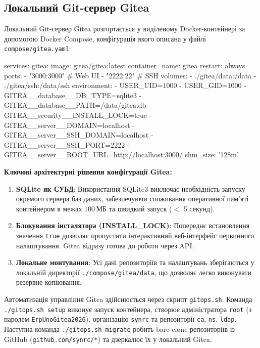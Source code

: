 \documentclass[12pt,a4paper]{article}
\let\originalfootnotesize\footnotesize
\let\oldverbatim\verbatim
\let\oldendverbatim\endverbatim
\renewenvironment{verbatim}{\originalfootnotesize\oldverbatim}{\oldendverbatim}
\begin{document}
\subsection{Локальний Git-сервер Gitea}

Локальний Git-сервер Gitea розгортається у виділеному Docker-контейнері за допомогою Docker Compose, конфігурація якого описана у файлі \texttt{compose/gitea.yaml}:

\begin{verbatim}
services:
  gitea:
    image: gitea/gitea:latest
    container_name: gitea
    restart: always
    ports:
      - "3000:3000"    # Web UI
      - "2222:22"      # SSH
    volumes:
      - ./gitea/data:/data
      - ./gitea/ssh:/data/ssh
    environment:
      - USER_UID=1000
      - USER_GID=1000
      - GITEA__database__DB_TYPE=sqlite3
      - GITEA__database__PATH=/data/gitea.db
      - GITEA__security__INSTALL_LOCK=true
      - GITEA__server__DOMAIN=localhost
      - GITEA__server__SSH_DOMAIN=localhost
      - GITEA__server__SSH_PORT=2222
      - GITEA__server__ROOT_URL=http://localhost:3000/
    shm_size: '128m'
\end{verbatim}

\textbf{Ключові архітектурні рішення конфігурації Gitea:}
\begin{enumerate}
    \item \textbf{SQLite як СУБД}: Використання SQLite3 виключає необхідність запуску окремого сервера баз даних, забезпечуючи споживання оперативної пам'яті контейнером в межах 100\,МБ та швидкий запуск ($<$ 5 секунд).
    \item \textbf{Блокування інсталятора (INSTALL\_LOCK)}: Попереднє встановлення значення \texttt{true} дозволяє пропустити інтерактивний веб-інтерфейс первинного налаштування. Gitea відразу готова до роботи через API.
    \item \textbf{Локальне монтування}: Усі дані репозиторіїв та налаштувань зберігаються у локальній директорії \texttt{./compose/gitea/data}, що дозволяє легко виконувати резервне копіювання.
\end{enumerate}

Автоматизація управління Gitea здійснюється через скрипт \texttt{gitops.sh}. Команда \texttt{./gitops.sh setup} виконує запуск контейнера, створює адміністратора \texttt{root} (з паролем \texttt{ErpUnoGitea2026}), організацію \texttt{synrc} та репозиторії \texttt{ca}, \texttt{ns}, \texttt{ldap}. Наступна команда \texttt{./gitops.sh migrate} робить bare-clone репозиторіїв із GitHub (\texttt{github.com/synrc/*}) та дзеркалює їх у локальний Gitea.
\end{document}

